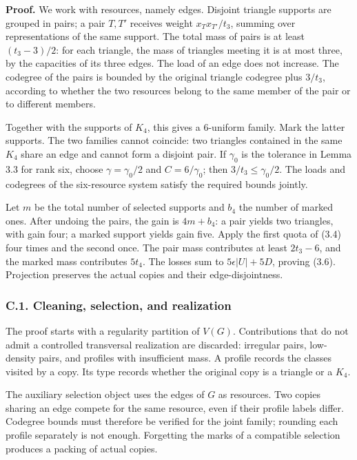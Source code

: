 \documentclass[english,11pt,a4paper]{article}
\begin{document}
\textbf{Proof.} We work with resources, namely edges. Disjoint triangle supports are grouped in pairs; a pair \(T,T'\) receives weight \(x_Tx_{T'}/t_3\), summing over representations of the same support. The total mass of pairs is at least \((t_3-3)/2\): for each triangle, the mass of triangles meeting it is at most three, by the capacities of its three edges. The load of an edge does not increase. The codegree of the pairs is bounded by the original triangle codegree plus \(3/t_3\), according to whether the two resources belong to the same member of the pair or to different members.

Together with the supports of \(K_4\), this gives a 6-uniform family. Mark the latter supports. The two families cannot coincide: two triangles contained in the same \(K_4\) share an edge and cannot form a disjoint pair. If \(\gamma_0\) is the tolerance in Lemma 3.3 for rank six, choose \(\gamma=\gamma_0/2\) and \(C=6/\gamma_0\); then \(3/t_3\le\gamma_0/2\). The loads and codegrees of the six-resource system satisfy the required bounds jointly.

Let \(m\) be the total number of selected supports and \(b_4\) the number of marked ones. After undoing the pairs, the gain is \(4m+b_4\): a pair yields two triangles, with gain four; a marked support yields gain five. Apply the first quota of (3.4) four times and the second once. The pair mass contributes at least \(2t_3-6\), and the marked mass contributes \(5t_4\). The losses sum to \(5\epsilon|U|+5D\), proving (3.6). Projection preserves the actual copies and their edge-disjointness.

\subsubsection{C.1. Cleaning, selection, and realization}\label{c.1.-cleaning-selection-and-realization}

The proof starts with a regularity partition of \(V(G)\). Contributions that do not admit a controlled transversal realization are discarded: irregular pairs, low-density pairs, and profiles with insufficient mass. A profile records the classes visited by a copy. Its type records whether the original copy is a triangle or a \(K_4\).

The auxiliary selection object uses the edges of \(G\) as resources. Two copies sharing an edge compete for the same resource, even if their profile labels differ. Codegree bounds must therefore be verified for the joint family; rounding each profile separately is not enough. Forgetting the marks of a compatible selection produces a packing of actual copies.
\end{document}

